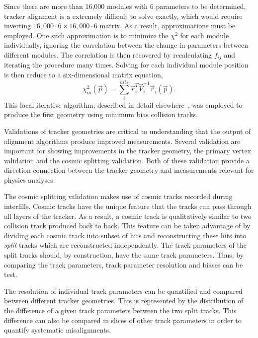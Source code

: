 Since there are more than 16,000 modules with 6 parameters to be determined,
tracker alignment is a 
extremely difficult to solve exactly, which would require inverting
$16,000\cdot6\times16,000\cdot6$ matrix.  As a result, approximations 
must be employed.   One such approximation is to minimize the $\chi^2$ for
each module individually, ignoring the correlation between the change in 
parameters between different modules.  The correlation is then recovered 
by recalculating $f_{ij}$ and iterating the procedure many times.  Solving 
for each individual module position is then reduce to a six-dimensional 
matrix equation, 
\begin{equation}
\chi^2_m(\vec{p})=\sum_i^{hits}\vec{r}^T_i\vec{V}_i^{-1}\vec{r}_i(\vec{p}).
\end{equation}
This local iterative algorithm, described in detail 
elsewhere~\cite{Karimaki:2006az,Brown:2008ccb}, was employed to produce 
the first geometry using minimum bias collision tracks.  

Validations of tracker geometries are critical to understanding that 
the output of alignment algorithms produce improved measurements.  
Several validation are important for showing improvements in the tracker 
geometry, the primary vertex validation and the cosmic splitting validation.
Both of these validation provide a direction connection between the 
tracker geometry and measurements relevant for physics analyses.   

The cosmic splitting validation makes use of cosmic tracks recorded 
during interfills.  Cosmic tracks have the unique feature that the 
tracks can pass through all layers of the tracker.  As a result,
a cosmic track is qualitatively similar to two collision track
produced back to back.  This feature can be taken advantage of by dividing
each cosmic track into subset of hits and reconstructing these hits 
into {\it split} tracks which are reconstructed independently.  The 
track parameters of the 
split tracks should, by construction, have the same track parameters.  
Thus, by comparing the track parameters, track parameter resolution
and biases can be test.  

The resolution of individual track parameters can be quantified
and compared between different tracker geometries.  This is
represented by the distribution of the difference of a given 
track parameters between the two split tracks.  This difference
can also be compared in slices of other track parameters in 
order to quantify systematic misalignments.

